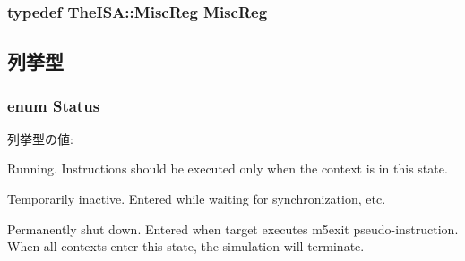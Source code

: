 \label{classThreadContext_a4617f528417b8f55f809ae0988284c9b}
\hypertarget{classThreadContext_aaf5f073a387db0556d1db4bcc45428bc}{
\subsubsection[{MiscReg}]{\setlength{\rightskip}{0pt plus 5cm}typedef TheISA::MiscReg {\bf MiscReg}}}
\label{classThreadContext_aaf5f073a387db0556d1db4bcc45428bc}


\subsection{列挙型}
\hypertarget{classThreadContext_a67a0db04d321a74b7e7fcfd3f1a3f70b}{
\subsubsection[{Status}]{\setlength{\rightskip}{0pt plus 5cm}enum {\bf Status}}}
\label{classThreadContext_a67a0db04d321a74b7e7fcfd3f1a3f70b}
\begin{Desc}
\item[列挙型の値: ]\par
\begin{description}
\item[{\em 
\hypertarget{classThreadContext_a67a0db04d321a74b7e7fcfd3f1a3f70ba26bd8444261cc58df7a86753c79d2520}{
Active}
\label{classThreadContext_a67a0db04d321a74b7e7fcfd3f1a3f70ba26bd8444261cc58df7a86753c79d2520}
}]Running. Instructions should be executed only when the context is in this state. \item[{\em 
\hypertarget{classThreadContext_a67a0db04d321a74b7e7fcfd3f1a3f70ba13bd6ff4bd5714ccc293f6802aacb40d}{
Suspended}
\label{classThreadContext_a67a0db04d321a74b7e7fcfd3f1a3f70ba13bd6ff4bd5714ccc293f6802aacb40d}
}]Temporarily inactive. Entered while waiting for synchronization, etc. \item[{\em 
\hypertarget{classThreadContext_a67a0db04d321a74b7e7fcfd3f1a3f70ba185a75df63e845aec97632afd6a34d6a}{
Halted}
\label{classThreadContext_a67a0db04d321a74b7e7fcfd3f1a3f70ba185a75df63e845aec97632afd6a34d6a}
}]Permanently shut down. Entered when target executes m5exit pseudo-\/instruction. When all contexts enter this state, the simulation will terminate. \end{description}
\end{Desc}




